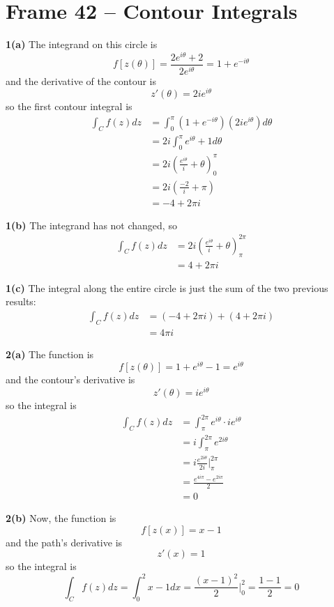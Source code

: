 \documentclass{article}
\begin{document}
\clearpage
\section{Frame 42 -- Contour Integrals}
\textbf{1(a)}
The integrand on this circle is
\[
	f[z(\theta)] = \frac{2e^{i\theta} + 2}{2e^{i\theta}}
	= 1 + e^{-i\theta}
\]
and the derivative of the contour is
\[
	z'(\theta) = 2ie^{i\theta}
\]
so the first contour integral is
\begin{align*}
	\int_C f(z) dz 
	&= \int_0^\pi (1 + e^{-i\theta})(2ie^{i\theta}) d\theta \\
	&= 2i \int_0^\pi e^{i\theta} + 1 d\theta \\
	&= 2i \left( \frac{e^{i\theta}}{i} + \theta \right)_0^\pi \\
	&= 2i \left( \frac{-2}{i} + \pi \right) \\
	&= -4 + 2\pi i
\end{align*}

\textbf{1(b)}
The integrand has not changed, so
\begin{align*}
	\int_C f(z) dz
	&= 2i \left( \frac{e^{i\theta}}{i} + \theta \right)_\pi^{2\pi} \\
	&= 4 + 2\pi i
\end{align*}

\textbf{1(c)}
The integral along the entire circle is just the sum of the two previous results:
\begin{align*}
	\int_C f(z) dz
	&= (-4 + 2\pi i) + (4 + 2\pi i) \\
	&= 4\pi i
\end{align*}

\textbf{2(a)}
The function is
\[
	f[z(\theta)] = 1 + e^{i\theta} - 1 = e^{i\theta}
\]
and the contour's derivative is
\[
	z'(\theta) = ie^{i\theta}
\]
so the integral is
\begin{align*}
	\int_C f(z) dz
	&= \int_\pi^{2\pi} e^{i\theta} \cdot ie^{i\theta} \\
	&= i \int_\pi^{2\pi} e^{2i\theta} \\
	&= i \frac{e^{2i\theta}}{2i} \Big|_{\pi}^{2\pi} \\
	&= \frac{e^{4i\pi} - e^{2i\pi}}{2} \\
	&= 0
\end{align*}

\textbf{2(b)}
Now, the function is
\[
	f[z(x)] = x - 1
\]
and the path's derivative is
\[
	z'(x) = 1
\]
so the integral is
\[
	\int_C f(z) dz 
	= \int_0^2 x - 1 dx
	= \frac{(x - 1)^2}{2} \Big|_0^2
	= \frac{1 - 1}{2} 
	= 0
\]
\end{document}
